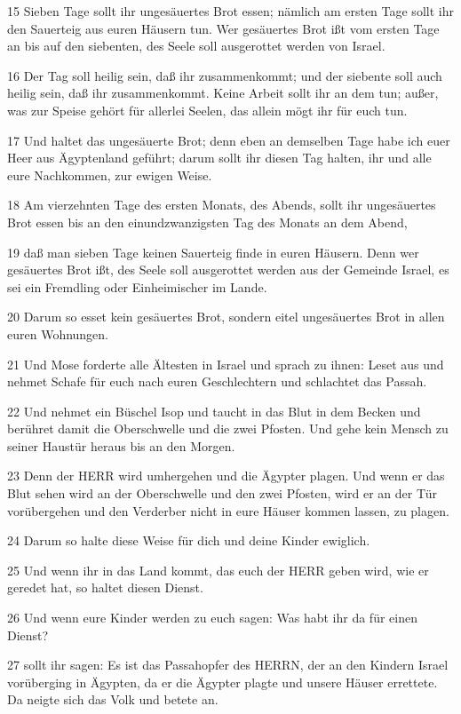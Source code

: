 \par 15 Sieben Tage sollt ihr ungesäuertes Brot essen; nämlich am ersten Tage sollt ihr den Sauerteig aus euren Häusern tun. Wer gesäuertes Brot ißt vom ersten Tage an bis auf den siebenten, des Seele soll ausgerottet werden von Israel.
\par 16 Der Tag soll heilig sein, daß ihr zusammenkommt; und der siebente soll auch heilig sein, daß ihr zusammenkommt. Keine Arbeit sollt ihr an dem tun; außer, was zur Speise gehört für allerlei Seelen, das allein mögt ihr für euch tun.
\par 17 Und haltet das ungesäuerte Brot; denn eben an demselben Tage habe ich euer Heer aus Ägyptenland geführt; darum sollt ihr diesen Tag halten, ihr und alle eure Nachkommen, zur ewigen Weise.
\par 18 Am vierzehnten Tage des ersten Monats, des Abends, sollt ihr ungesäuertes Brot essen bis an den einundzwanzigsten Tag des Monats an dem Abend,
\par 19 daß man sieben Tage keinen Sauerteig finde in euren Häusern. Denn wer gesäuertes Brot ißt, des Seele soll ausgerottet werden aus der Gemeinde Israel, es sei ein Fremdling oder Einheimischer im Lande.
\par 20 Darum so esset kein gesäuertes Brot, sondern eitel ungesäuertes Brot in allen euren Wohnungen.
\par 21 Und Mose forderte alle Ältesten in Israel und sprach zu ihnen: Leset aus und nehmet Schafe für euch nach euren Geschlechtern und schlachtet das Passah.
\par 22 Und nehmet ein Büschel Isop und taucht in das Blut in dem Becken und berühret damit die Oberschwelle und die zwei Pfosten. Und gehe kein Mensch zu seiner Haustür heraus bis an den Morgen.
\par 23 Denn der HERR wird umhergehen und die Ägypter plagen. Und wenn er das Blut sehen wird an der Oberschwelle und den zwei Pfosten, wird er an der Tür vorübergehen und den Verderber nicht in eure Häuser kommen lassen, zu plagen.
\par 24 Darum so halte diese Weise für dich und deine Kinder ewiglich.
\par 25 Und wenn ihr in das Land kommt, das euch der HERR geben wird, wie er geredet hat, so haltet diesen Dienst.
\par 26 Und wenn eure Kinder werden zu euch sagen: Was habt ihr da für einen Dienst?
\par 27 sollt ihr sagen: Es ist das Passahopfer des HERRN, der an den Kindern Israel vorüberging in Ägypten, da er die Ägypter plagte und unsere Häuser errettete. Da neigte sich das Volk und betete an.
